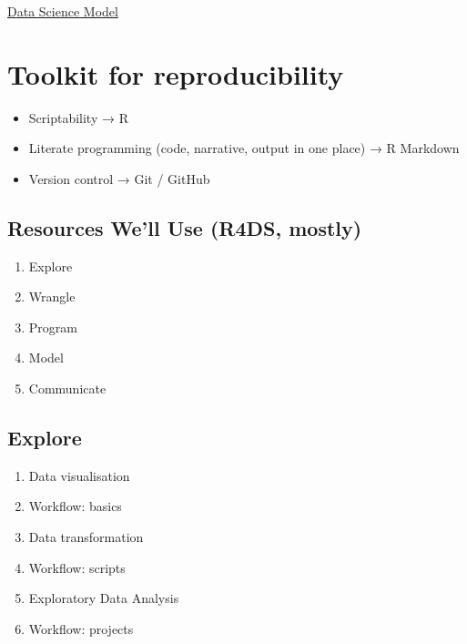 \documentclass[
]{book}
\providecommand{\tightlist}{%
  \setlength{\itemsep}{0pt}\setlength{\parskip}{0pt}}
\theoremstyle{definition}
\theoremstyle{definition}
\theoremstyle{definition}
\theoremstyle{definition}
\theoremstyle{remark}
\begin{document}
\href{https://d33wubrfki0l68.cloudfront.net/571b056757d68e6df81a3e3853f54d3c76ad6efc/32d37/diagrams/data-science.png}{Data Science Model}

\hypertarget{toolkit-for-reproducibility}{%
\chapter{Toolkit for reproducibility}\label{toolkit-for-reproducibility}}

\begin{itemize}
\tightlist
\item
  Scriptability → R
\item
  Literate programming (code, narrative, output in one place) → R Markdown
\item
  Version control → Git / GitHub
\end{itemize}

\hypertarget{resources-well-use-r4ds-mostly}{%
\section{Resources We'll Use (R4DS, mostly)}\label{resources-well-use-r4ds-mostly}}

\begin{enumerate}
\def\labelenumi{\arabic{enumi})}
\tightlist
\item
  Explore
\item
  Wrangle
\item
  Program
\item
  Model
\item
  Communicate
\end{enumerate}

\hypertarget{explore}{%
\section{Explore}\label{explore}}

\begin{enumerate}
\def\labelenumi{\arabic{enumi})}
\setcounter{enumi}{2}
\tightlist
\item
  Data visualisation
\item
  Workflow: basics
\item
  Data transformation
\item
  Workflow: scripts
\item
  Exploratory Data Analysis
\item
  Workflow: projects
\end{enumerate}
\end{document}
